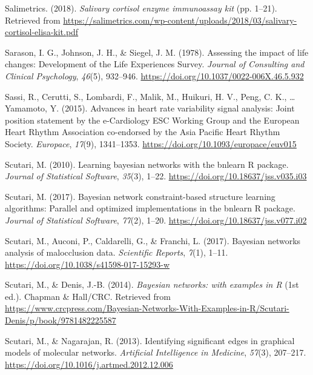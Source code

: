 \documentclass[man,floatsintext]{apa6}
\begin{document}
\leavevmode\hypertarget{ref-Salimetrics2018}{}%
Salimetrics. (2018). \emph{Salivary cortisol enzyme immunoassay kit} (pp. 1--21). Retrieved from \url{https://salimetrics.com/wp-content/uploads/2018/03/salivary-cortisol-elisa-kit.pdf}

\leavevmode\hypertarget{ref-Sarason1978}{}%
Sarason, I. G., Johnson, J. H., \& Siegel, J. M. (1978). Assessing the impact of life changes: Development of the Life Experiences Survey. \emph{Journal of Consulting and Clinical Psychology}, \emph{46}(5), 932--946. \url{https://doi.org/10.1037/0022-006X.46.5.932}

\leavevmode\hypertarget{ref-Sassi2015}{}%
Sassi, R., Cerutti, S., Lombardi, F., Malik, M., Huikuri, H. V., Peng, C. K., \ldots{} Yamamoto, Y. (2015). Advances in heart rate variability signal analysis: Joint position statement by the e-Cardiology ESC Working Group and the European Heart Rhythm Association co-endorsed by the Asia Pacific Heart Rhythm Society. \emph{Europace}, \emph{17}(9), 1341--1353. \url{https://doi.org/10.1093/europace/euv015}

\leavevmode\hypertarget{ref-R-bnlearn_b}{}%
Scutari, M. (2010). Learning bayesian networks with the bnlearn R package. \emph{Journal of Statistical Software}, \emph{35}(3), 1--22. \url{https://doi.org/10.18637/jss.v035.i03}

\leavevmode\hypertarget{ref-R-bnlearn_a}{}%
Scutari, M. (2017). Bayesian network constraint-based structure learning algorithms: Parallel and optimized implementations in the bnlearn R package. \emph{Journal of Statistical Software}, \emph{77}(2), 1--20. \url{https://doi.org/10.18637/jss.v077.i02}

\leavevmode\hypertarget{ref-Scutari2017}{}%
Scutari, M., Auconi, P., Caldarelli, G., \& Franchi, L. (2017). Bayesian networks analysis of malocclusion data. \emph{Scientific Reports}, \emph{7}(1), 1--11. \url{https://doi.org/10.1038/s41598-017-15293-w}

\leavevmode\hypertarget{ref-Scutari2014}{}%
Scutari, M., \& Denis, J.-B. (2014). \emph{Bayesian networks: with examples in R} (1st ed.). Chapman \& Hall/CRC. Retrieved from \url{https://www.crcpress.com/Bayesian-Networks-With-Examples-in-R/Scutari-Denis/p/book/9781482225587}

\leavevmode\hypertarget{ref-Scutari2013}{}%
Scutari, M., \& Nagarajan, R. (2013). Identifying significant edges in graphical models of molecular networks. \emph{Artificial Intelligence in Medicine}, \emph{57}(3), 207--217. \url{https://doi.org/10.1016/j.artmed.2012.12.006}
\end{document}
